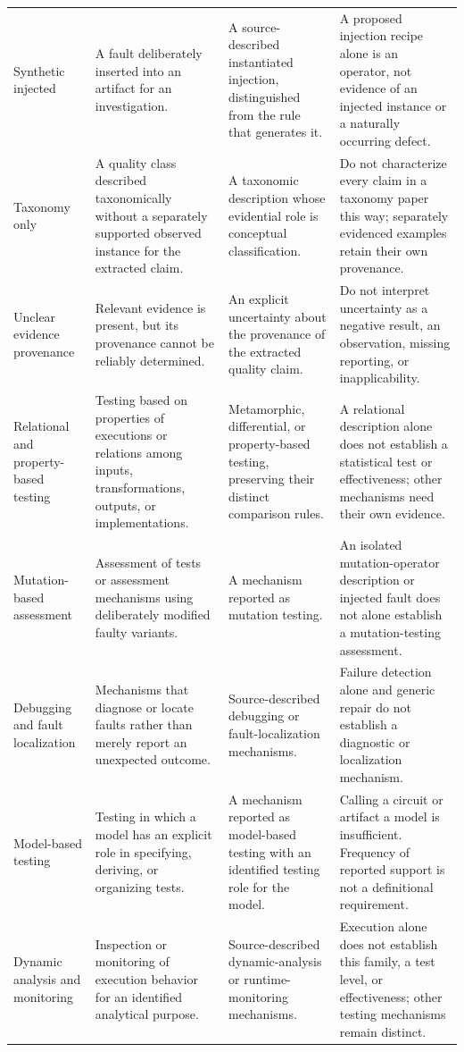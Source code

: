 \begin{longtable}{@{}p{.15\linewidth}p{.27\linewidth}p{.25\linewidth}p{.27\linewidth}@{}}
Synthetic injected & A fault deliberately inserted into an artifact for an investigation. & A source-described instantiated injection, distinguished from the rule that generates it. & A proposed injection recipe alone is an operator, not evidence of an injected instance or a naturally occurring defect.\\
Taxonomy only & A quality class described taxonomically without a separately supported observed instance for the extracted claim. & A taxonomic description whose evidential role is conceptual classification. & Do not characterize every claim in a taxonomy paper this way; separately evidenced examples retain their own provenance.\\
Unclear evidence provenance & Relevant evidence is present, but its provenance cannot be reliably determined. & An explicit uncertainty about the provenance of the extracted quality claim. & Do not interpret uncertainty as a negative result, an observation, missing reporting, or inapplicability.\\
Relational and property-based testing & Testing based on properties of executions or relations among inputs, transformations, outputs, or implementations. & Metamorphic, differential, or property-based testing, preserving their distinct comparison rules. & A relational description alone does not establish a statistical test or effectiveness; other mechanisms need their own evidence.\\
Mutation-based assessment & Assessment of tests or assessment mechanisms using deliberately modified faulty variants. & A mechanism reported as mutation testing. & An isolated mutation-operator description or injected fault does not alone establish a mutation-testing assessment.\\
Debugging and fault localization & Mechanisms that diagnose or locate faults rather than merely report an unexpected outcome. & Source-described debugging or fault-localization mechanisms. & Failure detection alone and generic repair do not establish a diagnostic or localization mechanism.\\
Model-based testing & Testing in which a model has an explicit role in specifying, deriving, or organizing tests. & A mechanism reported as model-based testing with an identified testing role for the model. & Calling a circuit or artifact a model is insufficient. Frequency of reported support is not a definitional requirement.\\
Dynamic analysis and monitoring & Inspection or monitoring of execution behavior for an identified analytical purpose. & Source-described dynamic-analysis or runtime-monitoring mechanisms. & Execution alone does not establish this family, a test level, or effectiveness; other testing mechanisms remain distinct.\\

\end{longtable}
